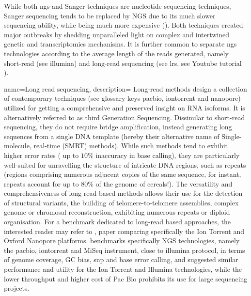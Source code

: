 {{\begin{figure}
   \caption[\textbf{An overview of sequencing techniques, by generation.}]{}
    \label{fig:rnaseq-generations}
\end{figure} 
While both \acrshort{ngs} and Sanger techniques are nucleotide sequencing techniques, Sanger sequencing tends 
to be replaced by NGS due to its much slower sequencing ability, while being much more expensive ().
Both techniques created major outbreaks by shedding unparalleled light on complex and intertwined genetic and transcriptomics mechanisms.
It is further common to separate ngs technologies according to the average length of the reads generated,
 namely short-read (see \Gls{illumina}) and long-read sequencing (see \gls{lrs}, see Youtube tutorial \autocite{clevalab22}).
}}

{name=Long read sequencing,
description={ 
Long-read methods design a collection of contemporary techniques (see glossary keys \gls{pacbio}, \gls{iontorrent} and \gls{nanopore}) utilized for getting a comprehensive and preserved insight on RNA isoforms. 
It is alternatively referred to as third Generation Sequencing. Dissimilar to short-read sequencing, they do not require bridge amplification, 
instead generating long sequences from a single DNA template (hereby their alternative name of Single-molecule, real-time (SMRT) methods).
 While such methods tend to exhibit higher error rates (
up to $10\%$ inaccuracy in base calling), they are particularly well-suited for unravelling the structure of intricate DNA regions, 
such as repeats (regions comprising numerous adjacent copies of the same sequence, for instant, 
repeats account for up to $80\%$ of the genome of cereals!). The versatility and comprehensiveness of long-read based methods allows their use 
for the detection of structural variants, the building of telomere-to-telomere assemblies,
 complex genome or chromosal reconstruction, exhibiting numerous repeats or diploid organisation. For a benchmark dedicated to long-read based approaches,
 the interested reader may refer to \autocite{tlili_etal22}, paper comparing specifically the 
 Ion Torrent and Oxford Nanopore platforms. \autocite{quail_etal12} benchmarks
 specifically NGS technologies, namely the \Gls{pacbio}, \Gls{iontorrent}
 and MiSeq instrument, close to \Gls{illumina} protocol, in terms of genome coverage,
 GC bias, \acrfull{snp} and base error calling, and suggested similar performance 
 and utility for the Ion Torrent and Illumina technologies, while the lower throughput
 and higher cost of Pac Bio prohibits its use for large sequencing projects. 
}}

